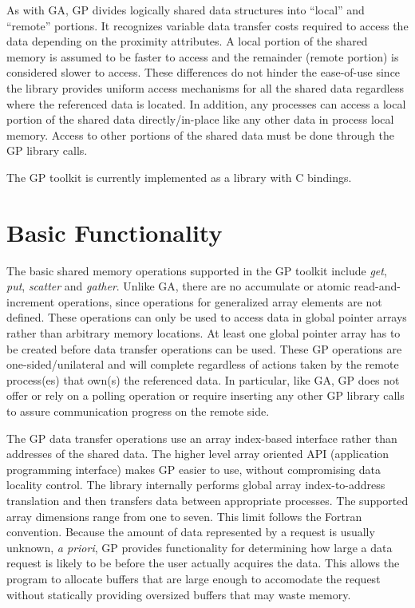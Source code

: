 As with GA, GP divides logically shared data structures into ``local'' and ``remote''
portions. It recognizes variable data transfer costs required to access the
data depending on the proximity attributes. A local portion of the shared
memory is assumed to be faster to access and the remainder (remote portion) is
considered slower to access. These differences do not hinder the ease-of-use
since the library provides uniform access mechanisms for all the shared data
regardless where the referenced data is located. In addition, any processes can
access a local portion of the shared data directly/in-place like any other data
in process local memory. Access to other portions of the shared data must be
done through the GP library calls. 

The GP toolkit is currently implemented as a library with C bindings.

\section{Basic Functionality}

The basic shared memory operations supported in the GP toolkit include \emph{get},
\emph{put}, \emph{scatter} and \emph{gather}. Unlike GA, there are no accumulate
or atomic read-and-increment operations, since operations for generalized array
elements are not defined. These operations can only be used to access data in global
pointer arrays rather than arbitrary memory locations. At least one global
pointer array has to
be created before data transfer operations can be used. These GP operations are
one-sided/unilateral and will complete regardless of actions taken by the
remote process(es) that own(s) the referenced data. In particular, like GA, GP does not
offer or rely on a polling operation or require inserting any other GP library
calls to assure communication progress on the remote side. 

The GP data transfer operations use an array index-based interface rather than
addresses of the shared data.  The
higher level array oriented API (application programming interface) makes GP
easier to use, without compromising data locality control. The
library internally performs global array index-to-address translation and then
transfers data between appropriate processes.
The supported array dimensions range from one to seven. This limit follows the
Fortran convention. Because the amount of data represented by a request is
usually unknown, \emph{a priori}, GP provides functionality for determining how
large a data request is likely to be before the user actually acquires the data.
This allows the program to allocate buffers that are large enough to accomodate
the request without statically providing oversized buffers that may waste
memory.
